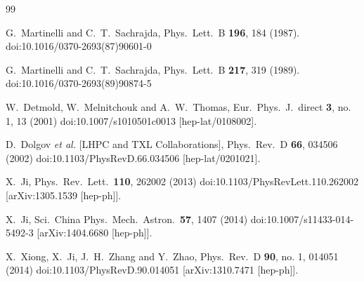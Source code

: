 \begin{thebibliography}{99}

  G.~Martinelli and C.~T.~Sachrajda,
  Phys.\ Lett.\ B {\bf 196}, 184 (1987).
  doi:10.1016/0370-2693(87)90601-0


  G.~Martinelli and C.~T.~Sachrajda,
  Phys.\ Lett.\ B {\bf 217}, 319 (1989).
  doi:10.1016/0370-2693(89)90874-5


  W.~Detmold, W.~Melnitchouk and A.~W.~Thomas,
  Eur.\ Phys.\ J.\ direct {\bf 3}, no. 1, 13 (2001)
  doi:10.1007/s1010501c0013
  [hep-lat/0108002].


  D.~Dolgov {\it et al.} [LHPC and TXL Collaborations],
  Phys.\ Rev.\ D {\bf 66}, 034506 (2002)
  doi:10.1103/PhysRevD.66.034506
  [hep-lat/0201021].


  X.~Ji,
  Phys.\ Rev.\ Lett.\  {\bf 110}, 262002 (2013)
  doi:10.1103/PhysRevLett.110.262002
  [arXiv:1305.1539 [hep-ph]].


  X.~Ji,
  Sci.\ China Phys.\ Mech.\ Astron.\  {\bf 57}, 1407 (2014)
  doi:10.1007/s11433-014-5492-3
  [arXiv:1404.6680 [hep-ph]].


  X.~Xiong, X.~Ji, J.~H.~Zhang and Y.~Zhao,
  Phys.\ Rev.\ D {\bf 90}, no. 1, 014051 (2014)
  doi:10.1103/PhysRevD.90.014051
  [arXiv:1310.7471 [hep-ph]].



\end{thebibliography}
